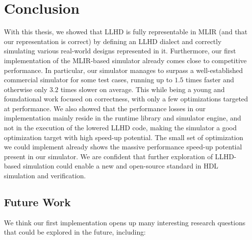 
\chapter{Conclusion}
With this thesis, we showed that LLHD is fully representable in MLIR (and that our representation is correct) by defining an LLHD dialect and correctly simulating various real-world designs represented in it.
Furthermore, our first implementation of the MLIR-based simulator already comes close to competitive performance. In particular, our simulator manages to surpass a well-established commercial simulator for some test cases, running up to $1.5$ times faster and otherwise only $3.2$ times slower on average. This while being a young and foundational work focused on correctness, with only a few optimizations targeted at performance.
We also showed that the performance losses in our implementation mainly reside in the runtime library and simulator engine, and not in the execution of the lowered LLHD code, making the simulator a good optimization target with high speed-up potential. The small set of optimization we could implement already shows the massive performance speed-up potential present in our simulator. We are confident that further exploration of LLHD-based simulation could enable a new and open-source standard in HDL simulation and verification.


\section{Future Work}
We think our first implementation opens up many interesting research questions that could be explored in the future, including:

